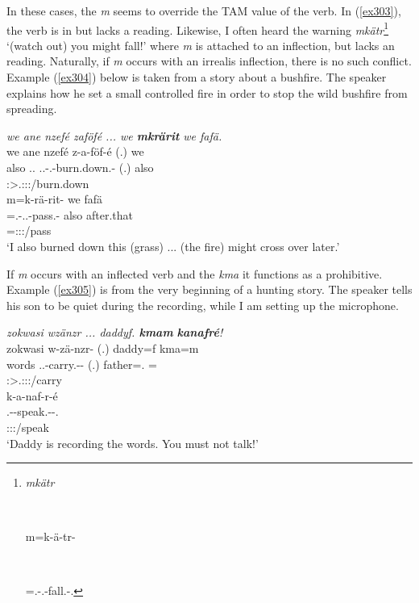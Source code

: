 In these cases, the  \emph{m} seems to override the TAM value of the verb. In (\ref{ex303}), the verb is in  but lacks a  reading. Likewise, I often heard the warning \emph{mkätr}\footnote{\parbox{0.02cm}{\hfill}\parbox{6cm}{\emph{mkätr}}\\ \parbox{0.1cm}{\hfill}\parbox{6cm}{m=k-ä-tr-\Zero}\\ \parbox{0.1cm}{\hfill}\parbox{6cm}{\Appr=\M.\Bet-\Vc.\Ndu-fall.\Rs-\Ssg.\Imp{}}} `(watch out) you might fall!' where \emph{m} is attached to an  inflection, but lacks an  reading. Naturally, if \emph{m} occurs with an irrealis inflection, there is no such conflict. Example (\ref{ex304}) below is taken from a story about a bushfire. The speaker explains how he set a small controlled fire in order to stop the wild bushfire from spreading.

\begin{exe}
	\ex \emph{we ane nzefé zaföfé ... we \textbf{mkrärit} we fafä.}\\
	\glll we ane nzefé z-a-föf-é (.) we\\
	also \Dem{} \Fsg.\Erg.\Emph{} \Tsg.\F.\Gam-\Vc.\Ndu-burn.down.\Rs-\Fsg{} (.) also\\
	{} {} {} \footnotesize{\Fsg:\Sbj>\Tsg.\F:\Obj:\Rpst:\Pfv/burn.down} {} {}\\
	\sn
	\glll m=k-rä-rit-\Zero{} we fafä\\
	\Appr=\M.\Bet-\Irr.\Vc.\Ndu-pass.\Rs-\Stsg{} also after.that\\
	\footnotesize{\Appr=\Stsg:\Sbj:\Irr:\Pfv/pass} {} {}\\
	\trans `I also burned down this (grass) ... (the fire) might cross over later.'\\
	\label{ex304}
\end{exe}

If \emph{m} occurs with an  inflected verb and the  \emph{kma} it functions as a prohibitive. Example (\ref{ex305}) is from the very beginning of a hunting story. The speaker tells his son to be quiet during the recording, while I am setting up the microphone.

\begin{exe}
	\ex \emph{zokwasi wzänzr ... daddyf. \textbf{kmam} \textbf{kanafré}!}\\
	\glll zokwasi w-zä-nzr-\Zero{} (.) daddy=f kma=m\\
	words \Tsg.\F.\Alph-carry.\Ext-\Ndu-\Stsg{} (.) father=\Erg.\Sg{} \Pot=\Appr{}\\
	{} \footnotesize{\Stsg:\Sbj>\Tsg.\F:\Obj:\Nonpast:\Ipfv/carry} {} {} {}\\
	\sn
	\glll k-a-naf-r-é\\
	\M.\Bet-\Vc-speak.\Ext-\Ndu-\Ssg.\Imp\\
	\footnotesize{\Ssg:\Sbj:\Imp:\Ipfv/speak}\\
	\trans `Daddy is recording the words. You must not talk!'
	\label{ex305}
\end{exe}

